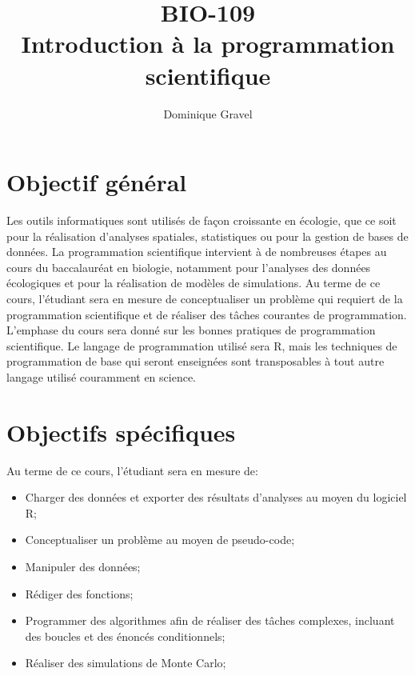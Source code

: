 \documentclass[12]{article}
\title{BIO-109 \\ Introduction à la programmation scientifique}
\date {\printdate{2022-01-10}}
\author {Dominique Gravel}
\affil {Département de biologie \\
Université de Sherbrooke \\
Local D8-3066 \\
819-821-8000 \#66589}
\affil {\url{dominique.gravel@usherbrooke.ca}}
\begin{document}
	\maketitle

	\section*{Objectif général}

	Les outils informatiques sont utilisés de façon croissante en écologie,
	que ce soit pour la réalisation d'analyses spatiales, statistiques ou pour
	la gestion de bases de données. La programmation scientifique intervient à
	de nombreuses étapes au cours du baccalauréat en biologie, notamment pour
	l'analyses des données écologiques et pour la réalisation de modèles
	de simulations. Au terme de ce cours, l'étudiant sera en mesure de
	conceptualiser un problème qui requiert de la programmation scientifique
	et de réaliser des tâches courantes de programmation. L'emphase du cours
	sera donné sur les bonnes pratiques de programmation scientifique. Le
	langage de programmation utilisé sera R, mais les techniques de
	programmation de base qui seront enseignées sont transposables à tout
	autre langage utilisé couramment en science.

	\section*{Objectifs spécifiques}

	Au terme de ce cours, l'étudiant sera en mesure de:

	\begin{itemize}
	\renewcommand{\labelitemi}{$\bullet$}

	\item Charger des données et exporter des résultats d'analyses au moyen du
	logiciel R;

	\item Conceptualiser un problème au moyen de pseudo-code;

	\item Manipuler des données;

	\item Rédiger des fonctions;

    \item Programmer des algorithmes afin de réaliser des tâches complexes,
	incluant des boucles et des énoncés conditionnels;

	\item Réaliser des simulations de Monte Carlo;

	\end{itemize}
\end{document}
